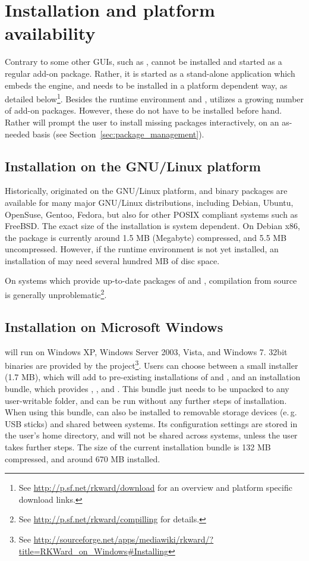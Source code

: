 \section{Installation and platform availability}
\label{sec:installing_starting_RKWard}
Contrary to some other  GUIs, such as ,  cannot be installed and started as a
regular  add-on package. Rather, it is started as a stand-alone application which embeds the
 engine, and needs to be installed in a platform dependent way, as detailed below\footnote{
  See \url{http://p.sf.net/rkward/download} for an overview and platform specific download links.
}. Besides the
 runtime environment and ,  utilizes a growing number of  add-on packages.
However, these do not have to be installed before hand. Rather  will prompt the user to install
missing packages interactively, on an as-needed basis (see Section~\ref{sec:package_management}).

\subsection{Installation on the GNU/Linux platform}
Historically,  originated on the GNU/Linux platform, and binary packages are available for many
major GNU/Linux distributions, including Debian, Ubuntu, OpenSuse, Gentoo, Fedora, but also for other POSIX
compliant systems such as FreeBSD.  The exact size of the installation is system dependent. On Debian x86, the
package is currently around 1.5 MB (Megabyte) compressed, and 5.5 MB uncompressed. However, if the 
runtime environment is not yet installed, an installation of  may need several hundred MB of disc
space.

On systems which provide up-to-date packages of  and , compilation from source is
generally unproblematic\footnote{
  See \url{http://p.sf.net/rkward/compilling} for details.
}.

\subsection{Installation on Microsoft Windows}
 will run on Windows XP, Windows Server 2003, Vista, and Windows 7. 32bit binaries are
provided by the project\footnote{
  See \url{http://sourceforge.net/apps/mediawiki/rkward/?title=RKWard\_on\_Windows\#Installing}
}. Users can
choose between a small installer (1.7 MB), which will add  to pre-existing installations of
 and , and an installation bundle, which provides , , and
. This bundle just needs to be unpacked to any user-writable folder, and can be run without any
further steps of installation. When using this bundle,  can also be installed to removable storage
devices (e.\,g. USB sticks) and shared between systems. Its configuration settings are stored in the user's
home directory, and will not be shared across systems, unless the user takes further steps. The size of the
current installation bundle is 132 MB compressed, and around 670 MB installed.

